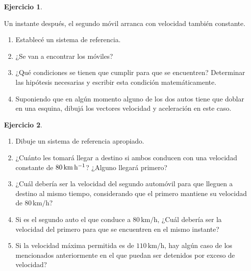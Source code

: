 \documentclass[a4paper,12pt,twoside]{book}
\newtheorem{ejercicio}{{Ejercicio}}[chapter]
\begin{document}
\begin{mdframed}[style=ejercicio-intermedio]
    \begin{ejercicio}
    \end{ejercicio}
    Un instante después, el segundo móvil arranca con velocidad también constante.
    \begin{enumerate}
        \item Establecé un sistema de referencia.
        \item ¿Se van a encontrar los móviles?
        \item ¿Qué condiciones se tienen que cumplir para que se encuentren? Determinar las hipótesis necesarias y escribir esta condición matemáticamente.
        \item Suponiendo que en algún momento alguno de los dos autos tiene que doblar en una esquina, dibujá los vectores velocidad y aceleración en este caso.
    \end{enumerate}
\end{mdframed}

\begin{mdframed}[style=ejercicio-intermedio]
    \begin{ejercicio}
    \end{ejercicio}
    \begin{enumerate}
        \item Dibuje un sistema de referencia apropiado.
        \item ¿Cuánto les tomará llegar a destino si ambos conducen con una velocidad constante de $80\,  \si{\kilo\metre\per\hour}$? ¿Alguno llegará primero?
        \item ¿Cuál debería ser la velocidad del segundo automóvil para que lleguen a destino al mismo tiempo, considerando que el primero mantiene su velocidad de $80\,\si{\kilo\metre\per\hour}$?
        \item Si es el segundo auto el que conduce a $80\,  \si{\kilo\metre\per\hour}$, ¿Cuál debería ser la velocidad del primero para que se encuentren en el mismo instante?
        \item Si la velocidad máxima permitida es de $110\,  \si{\kilo\metre\per\hour}$, hay algún caso de los mencionados anteriormente en el que puedan ser detenidos por exceso de velocidad?
    \end{enumerate}
\end{mdframed}
\end{document}

